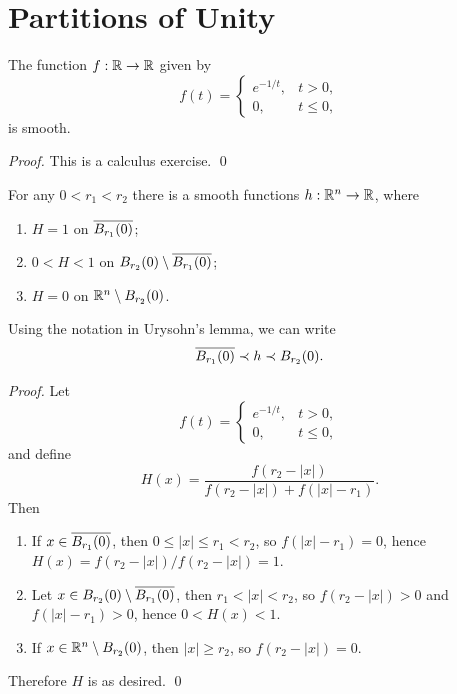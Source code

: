 \section{Partitions of Unity}
\begin{lemma}
    The function $f:\mathbb{R} \to \mathbb{R}$ given by 
    $$f(t) = \begin{cases}
    e^{-1/t}, &t > 0, \\
    0,        &t \leq 0, \end{cases}$$
    is smooth. 
\end{lemma}
\begin{proof}
    This is a calculus exercise. \qed 
\end{proof}
\begin{lemma}
    For any $0 < r_1 < r_2$ there is a smooth functions $h: \mathbb{R}^n \to \mathbb{R}$, where 
    \begin{enumerate}
    \item $H = 1$ on $\overline{B_{r_1}(0)}$;
    \item $0<H<1$ on $B_{r_2}(0) \setminus \overline{B_{r_1}(0)}$;
    \item $H = 0$ on $\mathbb{R}^n \setminus B_{r_2}(0)$.
    \end{enumerate}
    Using the notation in Urysohn's lemma, we can write 
    $$\overline{B_{r_1}(0)} \prec h \prec B_{r_2}(0). $$
\end{lemma}
\begin{proof}
    Let  $$f(t) = \begin{cases}
    e^{-1/t}, &t > 0, \\
    0,        &t \leq 0, \end{cases}$$
    and define 
    $$ H(x) = \frac{f(r_2 - |x|)}{f(r_2 - |x|) + f(|x| - r_1)}. $$
    Then
    \begin{enumerate}
    \item If $x \in \overline{B_{r_1}(0)}$, then $0 \leq |x| \leq r_1 < r_2$, so
    $f(|x|-r_1) = 0$, hence $H(x) = f(r_2-|x|) / f(r_2-|x|) = 1$.
    \item Let $x \in B_{r_2}(0) \setminus \overline{B_{r_1}(0)}$, then $r_1 < |x| < r_2$, so $f(r_2 - |x|) > 0$ and $f(|x|-r_1) > 0$, hence $0 < H(x) < 1$.
    \item If $x \in \mathbb{R}^n \setminus B_{r_2}(0)$, then $|x| \geq r_2$, so $f(r_2 - |x|) = 0$.
    \end{enumerate}
    Therefore $H$ is as desired. \qed 
\end{proof}

